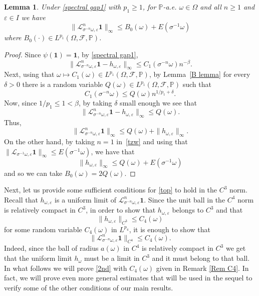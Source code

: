 \documentclass[11pt,reqno,a4paper]{article}
\newtheorem{lemma}[theorem]{Lemma}
\theoremstyle{special}
\renewcommand{\L}{\mathcal{L}}
\def\om{\omega}
\begin{document}
\begin{lemma}\label{Lemma bdd}
Under \eqref{spectral gap1} with $p_1\geq 1$,  for $\mathbb P$-a.e. $\om \in \Omega$ and all $n\geq 1$  and $\varepsilon\in I$ we have     $$
\|\mathcal L_{\sigma^{-n}\omega,\varepsilon}^n\mathbf {1}\|_\infty\leq B_0(\om)+E(\sigma^{-1}\om)
$$
where $B_0(\cdot)\in L^{p_1}(\Omega,\mathcal F,\mathbb P)$.
\end{lemma}
\begin{proof}
Since $\psi(\textbf{1})=\textbf{1}$, by \eqref{spectral gap1},
$$
\|\mathcal L_{\sigma^{-n}\omega,\varepsilon}^n\textbf{1}-h_{\om,\varepsilon}\|_\infty
\leq C_1(\sigma^{-n}\om)n^{-\beta}.
$$
Next, using that $\om\mapsto C_1(\om)\in L^{p_1}(\Omega, \mathcal F, \mathbb P)$, 
by Lemma~\ref{B lemma} for every $\delta>0$ there is a random variable $Q(\om)\in L^{p_1}(\Omega, \mathcal F, \mathbb P)$ such that 
$$
C_1(\sigma^{-n}\om)\leq Q(\om)n^{1/p_1+\delta}.
$$
Now, since $1/p_1\leq1<\beta$,  by taking $\delta$ small enough we see that 
\begin{equation}\label{tzw}
\|\mathcal L_{\sigma^{-n}\omega,\varepsilon}^n\textbf{1}-h_{\om,\varepsilon}\|_\infty\leq Q(\om).
\end{equation}
Thus, 
$$
\|\mathcal L_{\sigma^{-n}\omega,\varepsilon}^n\textbf{1}\|_\infty\leq Q(\om)+\|h_{\om,\varepsilon}\|_\infty.
$$
On the other hand, by taking $n=1$ in~\eqref{tzw} and using that $\|\mathcal L_{\sigma^{-1}\omega,\varepsilon}\mathbf {1}\|_\infty \leq E(\sigma^{-1}\om)$, we have that 
$$
\|h_{\om,\varepsilon}\|_\infty\leq Q(\om)+E(\sigma^{-1}\om)
$$
and so we can take $B_0(\om)=2Q(\om)$.
\end{proof}





Next, let us provide some sufficient conditions for \eqref{top} to hold in the $C^3$ norm. Recall that $h_{\omega,\varepsilon}$ is a uniform limit of $\mathcal L_{\sigma^{-n}\omega,\varepsilon}^n\textbf{1}$.  Since the unit ball in the $C^4$ norm is relatively compact in $C^3$, in order to show that $h_{\omega,\varepsilon}$ belongs to $C^3$ and that 
$$
\|h_{\omega,\varepsilon}\|_{C^3}\leq C_4(\om)
$$
for some random variable $C_4(\omega)$ in $L^{p_4}$, it is enough to show that 
\begin{equation}\label{2nd}
 \|\L_{\sigma^{-n}\omega,\varepsilon}^n\textbf{1}\|_{C^4}\leq C_4(\omega) .  \end{equation}
Indeed,  since the ball of radius $a(\omega)$ in $C^4$ is relatively compact in $C^3$ we get that the uniform limit $h_\omega$ must be a limit  in $C^3$ and it must belong to that ball. In what follows we will prove \eqref{2nd} with $C_4(\om)$ given in Remark \ref{Rem C4}. In fact, we will prove even more general estimates that will be used in the sequel to verify some of the other conditions of our main results.
\end{document}
